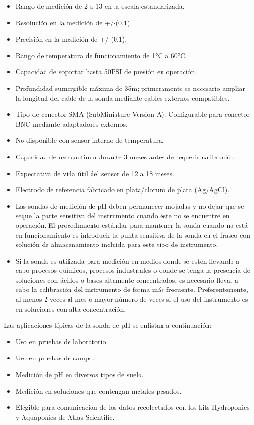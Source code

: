 \begin{itemize}
    \item Rango de medición de 2 a 13 en la escala estandarizada.
    \item Resolución en la medición de +/-(0.1).
    \item Precisión en la medición de +/-(0.1).
    \item Rango de temperatura de funcionamiento de 1°C a 60°C.
    \item Capacidad de soportar hasta 50PSI de presión en operación.
    \item Profundidad sumergible máxima de 35m; primeramente es necesario ampliar la longitud del cable de la sonda mediante cables externos compatibles.
    \item Tipo de conector SMA (SubMiniature Version A). Configurable para conector BNC mediante adaptadores externos.
    \item No disponible con sensor interno de temperatura.
    \item Capacidad de uso continuo durante 3 meses antes de requerir calibración.
    \item Expectativa de vida útil del sensor de 12 a 18 meses.
    \item Electrodo de referencia fabricado en plata/cloruro de plata (Ag/AgCl).
    \item Las sondas de medición de pH deben permanecer mojadas y no dejar que se seque la parte sensitiva del instrumento cuando éste no se encuentre en operación. El procedimiento estándar para mantener la sonda cuando no está 
    en funcionamiento es introducir la punta sensitiva de la sonda en el frasco con solución de almacenamiento incluida para este tipo de instrumento.
    \item Si la sonda es utilizada para medición en medios donde se estén llevando a cabo procesos químicos, procesos industriales o donde se tenga la presencia de soluciones con ácidos o bases altamente concentrados, es 
    necesario llevar a cabo la calibración del instrumento de forma más frecuente. Preferentemente, al menos 2 veces al mes o mayor número de veces si el uso del instrumento es en soluciones con alta concentración.    
\end{itemize}

Las aplicaciones típicas de la sonda de pH se enlistan a continuación:

\begin{itemize}
    \item Uso en pruebas de laboratorio.
    \item Uso en pruebas de campo.
    \item Medición de pH en diversos tipos de suelo.
    \item Medición en soluciones que contengan metales pesados.
    \item Elegible para comunicación de los datos recolectados con los kits Hydroponics y Aquaponics de Atlas Scientific.
\end{itemize}

